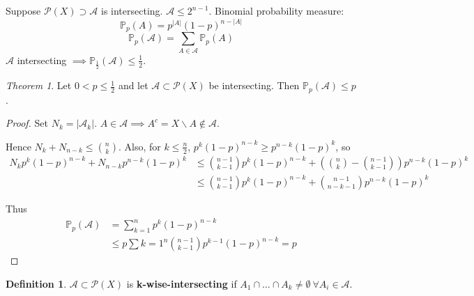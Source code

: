 \documentclass[a4paper]{article}
\theoremstyle{definition}
\newtheorem*{definition}{Definition}
\theoremstyle{remark}
\theoremstyle{default}
\newtheorem{theorem}{Theorem}
\newcommand*\abs[1]{\left|#1\right|}
\begin{document}
Suppose $\mathcal{P}(X) \supset \mathcal{A}$ is intersecting.
$\mathcal{A} \leq 2^{n-1}$.
Binomial probability measure:
$$\mathbb{P}_p(A) = p^{\abs{A}}(1-p)^{n-\abs{A}}$$
$$\mathbb{P}_p(\mathcal{A}) = \sum_{A \in \mathcal{A}}\mathbb{P}_p(A)$$
$\mathcal{A}$ intersecting $\implies \mathbb{P}_{\frac{1}{2}}(\mathcal{A}) \leq \frac{1}{2}$.

\begin{theorem}
	Let $0<p\leq \frac{1}{2}$ and let $\mathcal{A} \subset \mathcal{P}(X)$ be intersecting.
	Then $\mathbb{P}_p(\mathcal{A}) \leq p$.
\end{theorem}
\begin{proof}
	Set $N_k = \abs{\mathcal{A}_k}$.
	$A \in \mathcal{A} \implies A^c = X\backslash A \not\in \mathcal{A}$.
	
	Hence $N_k + N_{n-k} \leq {n \choose k}$.
	Also, for $k \leq \frac{n}{2}$, $p^k(1-p)^{n-k} \geq p^{n-k}(1-p)^k$, so
	\begin{align*}
		N_kp^k(1-p)^{n-k} + N_{n-k}p^{n-k}(1-p)^k & \leq {n-1 \choose k-1}p^k(1-p)^{n-k} + \left({n \choose k} - {n-1 \choose k-1}\right)p^{n-k}(1-p)^k \\
		& \leq {n-1 \choose k-1}p^k(1-p)^{n-k} + {n-1 \choose n-k-1}p^{n-k}(1-p)^k
	\end{align*}
	
	Thus
	\begin{align*}
		\mathbb{P}_p(\mathcal{A}) &= \sum_{k=1}^n p^k(1-p)^{n-k} \\
		&\leq p \sum{k=1}^n {n-1 \choose k-1}p^{k-1}(1-p)^{n-k} = p
	\end{align*}
\end{proof}

\begin{definition}
	$\mathcal{A} \subset \mathcal{P}(X)$ is \textbf{k-wise-intersecting} if $A_1 \cap \dots \cap A_k \neq \emptyset\ \forall A_i \in \mathcal{A}$.
\end{definition}
\end{document}
